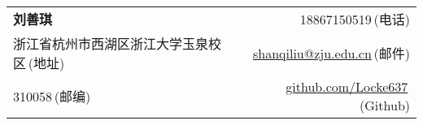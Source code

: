 \newcommand{\paint}[3]{
    \begin{minipage}{#1}
        \texttt{[image: \#3]}
    \end{minipage}
}
\newcommand{\myheader}{
    \begin{tabular*}{\textwidth}{l@{\extracolsep{\fill}}r}
        \specialrule{0em}{4pt}{4pt}
        \textbf{{\LARGE 刘善琪}} & 18867150519$\,${\color{labelgrey}(电话)}\\
        浙江省杭州市西湖区浙江大学玉泉校区$\,${\color{labelgrey}(地址)} &\href{mailto:shanqiliu@zju.edu.cn}{shanqiliu@zju.edu.cn}$\,${\color{labelgrey}(邮件)} \\
        310058$\,${\color{labelgrey}(邮编)} & \href{https://github.com/Locke637}{github.com/Locke637}$\,${\color{labelgrey}(Github)} \\
    \end{tabular*}\\
}

\myheader

